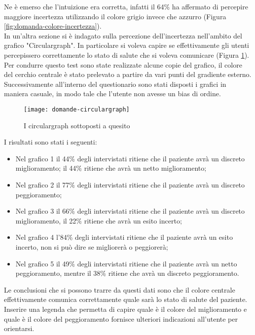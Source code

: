 Ne è emerso che l'intuizione era corretta, infatti il 64\% ha affermato di percepire maggiore incertezza utilizzando il colore grigio invece che azzurro (Figura \ref{fig:domanda-colore-incertezza}). \\

In un'altra sezione si è indagato sulla percezione dell'incertezza nell'ambito del grafico "Circulargraph". In particolare si voleva capire se effettivamente gli utenti percepissero correttamente lo stato di salute che si voleva comunicare (Figura \ref{fig:domande-circulargraph}). Per condurre questo test sono state realizzate alcune copie del grafico, il colore del cerchio centrale è stato prelevato a partire da vari punti del gradiente esterno. Successivamente all'interno del questionario sono stati disposti i grafici in maniera casuale, in modo tale che l'utente non avesse un bias di ordine. \\

\begin{figure}[!ht] 
    \centering 
    \texttt{[image: domande-circulargraph]}
    \caption{I circulargraph sottoposti a quesito}
    \label{fig:domande-circulargraph}
\end{figure}

I risultati sono stati i seguenti:
\begin{itemize}
    \item Nel grafico 1 il 44\% degli intervistati ritiene che il paziente avrà un discreto miglioramento; il 44\% ritiene che avrà un netto miglioramento;
    \item Nel grafico 2 il 77\% degli intervistati ritiene che il paziente avrà un discreto peggioramento;
    \item Nel grafico 3 il 66\% degli intervistati ritiene che il paziente avrà un discreto miglioramento, il 22\% ritiene che avrà un esito incerto;
    \item Nel grafico 4 l'84\% degli intervistati ritiene che il paziente avrà un esito incerto, non si può dire se migliorerà o peggiorerà;
    \item Nel grafico 5 il 49\% degli intervistati ritiene che il paziente avrà un netto peggioramento, mentre il 38\% ritiene che avrà un discreto peggioramento.
\end{itemize}
Le conclusioni che si possono trarre da questi dati sono che il colore centrale effettivamente comunica correttamente quale sarà lo stato di salute del paziente. Inserire una legenda che permetta di capire quale è il colore del miglioramento e quale è il colore del peggioramento fornisce ulteriori indicazioni all'utente per orientarsi. \\

